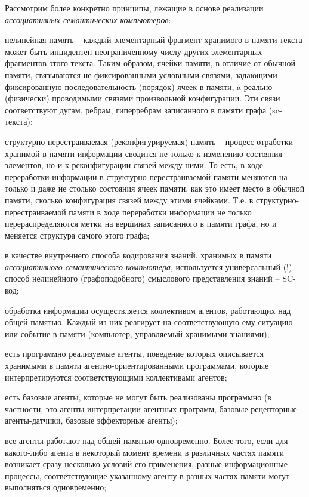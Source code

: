 Рассмотрим более конкретно принципы, лежащие в основе реализации \textit{ассоциативных семантических компьютеров}:
\begin{textitemize}
	\item нелинейная память -- каждый элементарный фрагмент хранимого в памяти текста может быть инцидентен неограниченному числу других элементарных фрагментов этого текста. Таким образом, ячейки памяти, в отличие от обычной памяти, связываются не фиксированными условными связями, задающими фиксированную последовательность (порядок) ячеек в памяти, a реально (физически) проводимыми связями произвольной конфигурации. Эти связи соответствуют дугам, ребрам, гиперребрам записанного в памяти графа (sc-текста);
	\item структурно-перестраиваемая (реконфигурируемая) память -- процесс отработки хранимой в памяти информации сводится не только к изменению состояния элементов, но и к реконфигурации связей между ними. То есть, в ходе переработки информации в структурно-перестраиваемой памяти меняются на только и даже не столько состояния ячеек памяти, как это имеет место в обычной памяти, сколько конфигурация связей между этими ячейками. Т.е. в структурно-перестраиваемой памяти в ходе переработки информации не только перераспределяются метки на вершинах записанного в памяти графа, но и меняется структура самого этого графа;	
	\item в качестве внутреннего способа кодирования знаний, хранимых в памяти \textit{ассоциативного семантического компьютера}, используется универсальный (!) способ нелинейного (графоподобного) смыслового представления знаний -- SC-код;
	\item обработка информации осуществляется коллективом агентов, работающих над общей памятью. Каждый из них реагирует на соответствующую ему ситуацию или событие в памяти (компьютер, управляемый хранимыми знаниями);
	\item есть программно реализуемые агенты, поведение которых описывается хранимыми в памяти агентно-ориентированными программами, которые интерпретируются соответствующими коллективами агентов;
	\item есть базовые агенты, которые не могут быть реализованы программно (в частности, это агенты интерпретации агентных программ, базовые рецепторные агенты-датчики, базовые эффекторные агенты);
	\item все агенты работают над общей памятью одновременно. Более того, если для какого-либо агента в некоторый момент времени в различных частях памяти возникает сразу несколько условий его применения, разные информационные процессы, соответствующие указанному агенту в разных частях памяти могут выполняться одновременно;

\end{textitemize}

